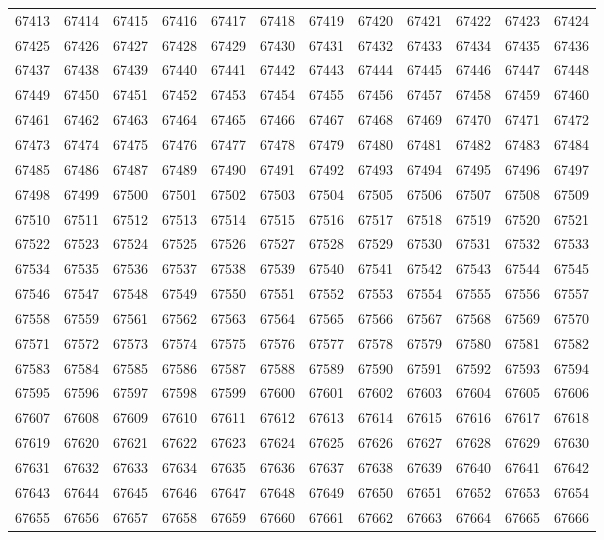 \begin{center}
\begin{longtable}{llllllllllll}
67413 &67414 &67415 &67416 &67417 &67418 &67419 &67420 &67421 &67422 &67423 &67424 \\
67425 &67426 &67427 &67428 &67429 &67430 &67431 &67432 &67433 &67434 &67435 &67436 \\
67437 &67438 &67439 &67440 &67441 &67442 &67443 &67444 &67445 &67446 &67447 &67448 \\
67449 &67450 &67451 &67452 &67453 &67454 &67455 &67456 &67457 &67458 &67459 &67460 \\
67461 &67462 &67463 &67464 &67465 &67466 &67467 &67468 &67469 &67470 &67471 &67472 \\
67473 &67474 &67475 &67476 &67477 &67478 &67479 &67480 &67481 &67482 &67483 &67484 \\
67485 &67486 &67487 &67489 &67490 &67491 &67492 &67493 &67494 &67495 &67496 &67497 \\
67498 &67499 &67500 &67501 &67502 &67503 &67504 &67505 &67506 &67507 &67508 &67509 \\
67510 &67511 &67512 &67513 &67514 &67515 &67516 &67517 &67518 &67519 &67520 &67521 \\
67522 &67523 &67524 &67525 &67526 &67527 &67528 &67529 &67530 &67531 &67532 &67533 \\
67534 &67535 &67536 &67537 &67538 &67539 &67540 &67541 &67542 &67543 &67544 &67545 \\
67546 &67547 &67548 &67549 &67550 &67551 &67552 &67553 &67554 &67555 &67556 &67557 \\
67558 &67559 &67561 &67562 &67563 &67564 &67565 &67566 &67567 &67568 &67569 &67570 \\
67571 &67572 &67573 &67574 &67575 &67576 &67577 &67578 &67579 &67580 &67581 &67582 \\
67583 &67584 &67585 &67586 &67587 &67588 &67589 &67590 &67591 &67592 &67593 &67594 \\
67595 &67596 &67597 &67598 &67599 &67600 &67601 &67602 &67603 &67604 &67605 &67606 \\
67607 &67608 &67609 &67610 &67611 &67612 &67613 &67614 &67615 &67616 &67617 &67618 \\
67619 &67620 &67621 &67622 &67623 &67624 &67625 &67626 &67627 &67628 &67629 &67630 \\
67631 &67632 &67633 &67634 &67635 &67636 &67637 &67638 &67639 &67640 &67641 &67642 \\
67643 &67644 &67645 &67646 &67647 &67648 &67649 &67650 &67651 &67652 &67653 &67654 \\
67655 &67656 &67657 &67658 &67659 &67660 &67661 &67662 &67663 &67664 &67665 &67666 \\

\end{longtable}
\end{center}
